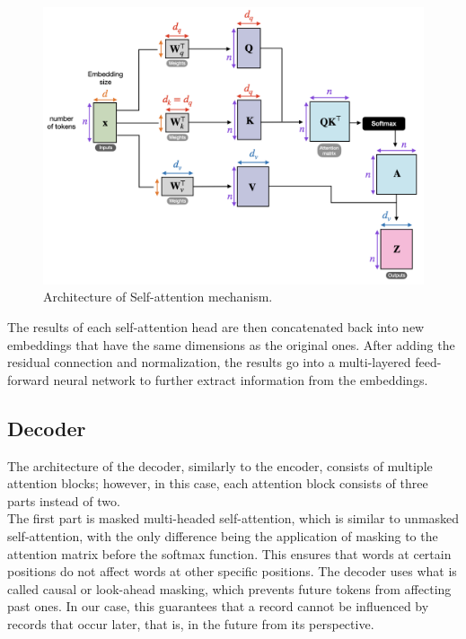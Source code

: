 \begin{figure}[!h]
	\centering
	
	\includegraphics[width=1\textwidth]{images/self_attention.png}
	
	\caption{Architecture of Self-attention mechanism.}
	\label{fig:self_att}
\end{figure}

The results of each self-attention head are then concatenated back into new embeddings that have the same dimensions as the original ones. After adding the residual connection and normalization, the results go into a multi-layered feed-forward neural network to further extract information from the embeddings.

\subsection{Decoder}

The architecture of the decoder, similarly to the encoder, consists of multiple attention blocks; however, in this case, each attention block consists of three parts instead of two.
\\

The first part is masked multi-headed self-attention, which is similar to unmasked self-attention, with the only difference being the application of masking to the attention matrix before the softmax function. This ensures that words at certain positions do not affect words at other specific positions. The decoder uses what is called causal or look-ahead masking, which prevents future tokens from affecting past ones. In our case, this guarantees that a record cannot be influenced by records that occur later, that is, in the future from its perspective.
\\

